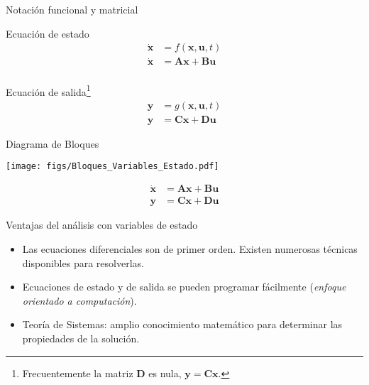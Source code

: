 \documentclass[xcolor={usenames,svgnames,dvipsnames}]{beamer}
\begin{document}
\begin{frame}[label={sec:orgde0bade}]{Notación funcional y matricial}
\begin{block}{Ecuación de estado}
\begin{align*}
\dot{\mathbf{x}} &= f(\mathbf{x}, \mathbf{u}, t)\\
\dot{\mathbf{x}} &= \mathbf{A}\mathbf{x} + \mathbf{B}\mathbf{u}\\
\end{align*}
\end{block}

\begin{block}{Ecuación de salida\footnote{Frecuentemente la matriz \(\mathbf{D}\) es nula, \(\mathbf{y} = \mathbf{C}\mathbf{x}\).}}
\begin{align*}
\mathbf{y} &= g(\mathbf{x}, \mathbf{u}, t)\\
\mathbf{y} &= \mathbf{C}\mathbf{x} + \mathbf{D}\mathbf{u} 
\end{align*}
\end{block}
\end{frame}

\begin{frame}[label={sec:org14d9953}]{Diagrama de Bloques}
\begin{center}
\texttt{[image: figs/Bloques\_Variables\_Estado.pdf]}
\end{center}

\begin{align*}
  \dot{\mathbf{x}} &= \mathbf{A}\mathbf{x} + \mathbf{B}\mathbf{u}\\
  \mathbf{y} &= \mathbf{C}\mathbf{x} + \mathbf{D}\mathbf{u} 
\end{align*}
\end{frame}

\begin{frame}[label={sec:orgdbae9ac}]{Ventajas del análisis con variables de estado}
\begin{itemize}
\item Las ecuaciones diferenciales son de primer orden. Existen numerosas técnicas disponibles para resolverlas.
\item Ecuaciones de estado y de salida se pueden programar fácilmente (\emph{enfoque orientado a computación}).
\item Teoría de Sistemas: amplio conocimiento matemático para determinar las propiedades de la solución.
\end{itemize}
\end{frame}
\end{document}
